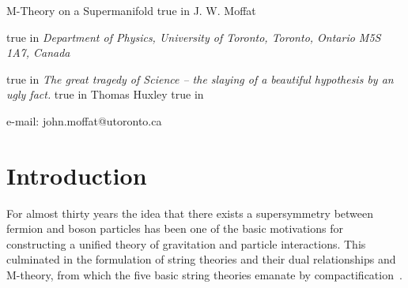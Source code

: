 \documentclass[a4paper,12pt]{article}
\begin{document}
\begin{center}
{\Large M-Theory on a Supermanifold}
 true in
{\large J. W. Moffat}
\date{}
 true in
{\it Department of Physics, University of
Toronto, Toronto, Ontario M5S 1A7, Canada}
\end{center}

\begin{abstract}%
A conjectured finite M-theory based on eleven-dimensional
supergravity formulated in a superspace with a non-anticommutative
\myHighlight{$\diamondsuit$}\coordHE{}-product of field operators is proposed. Supermembranes are
incorporated in the superspace \myHighlight{$\diamondsuit$}\coordHE{}-product formalism. When the deformed
supersymmetry invariant action of eleven-dimensional supergravity theory is expanded
about the standard supersymmetry invariant action, the spontaneously compactified
M-theory can yield a four-dimensional de Sitter spacetime inflationary solution with
dark energy described by the four-form F-fields. A fit to the present
cosmological data for an accelerating universe is obtained from matter
fields describing the dominant dark matter and the four-form F-field dark energy.
Chiral fermions are obtained from the M-theory by allowing singularities in the
compact internal seven-dimensional space. The possibility of obtaining a realistic
M-theory containing the standard model is discussed.
\end{abstract}  
true in {\it The great tragedy of Science -- the slaying of a beautiful hypothesis
by an ugly fact.}   true in Thomas Huxley  true in

e-mail: john.moffat@utoronto.ca

\section{\bf Introduction}

For almost thirty years the idea that there exists a supersymmetry
between fermion and boson particles has been one of the basic motivations
for constructing a unified theory of gravitation and particle interactions.
This culminated in the formulation of string theories and their dual
relationships and M-theory, from which the five basic string theories
emanate by compactification~\cite{Townsend,Polchinski}.
\end{document}
